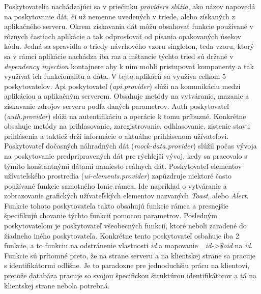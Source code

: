Poskytovatelia nachádzajúci sa v priečinku \textit{providers slúžia}, ako názov napovedá na poskytovanie dát, či už nemenne uvedených v triede, alebo získaných z aplikačného serveru. Okrem získavania dát môžu obsahovať funkcie používané v rôznych častiach aplikácie a tak odprosťovať od písania opakovaných úsekov kódu. Jedná sa spravidla o triedy návrhového vzoru singleton, teda vzoru, ktorý sa v rámci aplikácie nachádza iba raz a inštancie týchto tried sú držané v \textit{dependency injection} kontajnere aby k nim mohli pristupovať komponenty a tak využívať ich funkcionalitu a dáta. V tejto aplikácií sa využíva celkom 5 poskytovateľov. Api poskytovateľ (\textit{api.provider}) slúži na komunikáciu medzi aplikáciou a aplikačným serverom. Obsahuje metódy na vytváranie, mazanie a získavanie zdrojov serveru podľa daných parametrov. Auth poskytovateľ (\textit{auth.provider}) slúži na autentifikáciu a operácie k tomu príbuzné. Konkrétne obsahuje metódy na prihlasovanie, zaregistrovanie, odhlasovanie, zistenie stavu prihlásenia a taktiež drží informácie o aktuálne prihlásenom užívateľovi. Poskytovateľ dočasných náhradných dát (\textit{mock-data.provider}) slúžil počas vývoja na poskytovanie predpripravených dát pre rýchlejší vývoj, kedy sa pracovalo s týmito konštantnými dátami namiesto reálnych dát. Poskytovateľ elementov užívateľského prostredia (\textit{ui-elements.provider}) zapúzdruje niektoré často používané funkcie samotného Ionic rámca. Ide napríklad o vytváranie a zobrazovanie grafických užívateľských elementov nazvaných \textit{Toast}, alebo \textit{Alert}. Funkcie tohoto poskytovateľa takto obsahujú funkcie rámca a presnejšie špecifikujú chovanie týchto funkcií pomocou parametrov. Posledným poskytovateľom je poskytovateľ všeobecných funkcií, ktoré neboli zaradené do žiadneho iného poskytovateľa. Konkrétne tento poskytovateľ osbahuje iba 2 funkcie, a to funkciu na odstránenie vlastnosti \textit{id} a mapovanie \textit{\_id->\$oid} na \textit{id}. Funkcie sú prítomné preto, že na strane serveru a na klientskej strane sa pracuje s identifikátormi odlišne. Je to paradoxne pre jednoduchšiu prácu na klientovi, pretože databáza pracuje so svojou špecifickou štruktúrou identifikátorov a tá na klientskej strane nebola potrebná.

